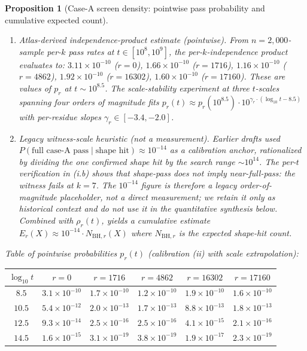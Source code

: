 \documentclass[11pt]{article}
\renewcommand{\_}{\origunderscore\allowbreak}
\newtheorem{proposition}[theorem]{Proposition}
\theoremstyle{definition}
\theoremstyle{remark}
\begin{document}
\begin{proposition}[Case-A screen density: pointwise pass probability and cumulative expected count]
\begin{enumerate}
\item[(ii)] \emph{Atlas-derived independence-product estimate
(pointwise).}  From $n=2{,}000$-sample per-$k$ pass rates at
$t\in[10^8,10^9]$, the per-$k$-independence product evaluates to:
$3.11\times 10^{-10}$ ($r=0$), $1.66\times 10^{-10}$ ($r=1716$),
$1.16\times 10^{-10}$ ($r=4862$), $1.92\times 10^{-10}$ ($r=16302$),
$1.60\times 10^{-10}$ ($r=17160$).  These are values of $p_r$ at
$t\sim 10^{8.5}$.  The scale-stability experiment at three $t$-scales
spanning four orders of magnitude fits
$p_r(t) \approx p_r(10^{8.5})\cdot 10^{\gamma_r\cdot(\log_{10} t - 8.5)}$
with per-residue slopes $\gamma_r\in[-3.4,-2.0]$.

\item[(iii)] \emph{Legacy witness-scale heuristic (not a measurement).}
Earlier drafts used $P(\text{full case-A pass}\mid \text{shape hit})
\approx 10^{-14}$ as a calibration anchor, rationalized by dividing
the one confirmed shape hit by the search range $\sim 10^{14}$.  The
per-$t$ verification in (i.b) shows that shape-pass does not imply
near-full-pass: the witness fails at $k=7$.  The $10^{-14}$ figure is
therefore a legacy order-of-magnitude placeholder, not a direct
measurement; we retain it only as historical context and do not use
it in the quantitative synthesis below.
Combined with $\rho_r(t)$, yields a cumulative estimate
$E_r(X)\approx 10^{-14}\cdot N_{\mathrm{BH}, r}(X)$ where
$N_{\mathrm{BH},r}$ is the expected shape-hit count.
\end{enumerate}

\emph{Table of pointwise probabilities $p_r(t)$} (calibration (ii) with
scale extrapolation):

\begin{center}
\begin{tabular}{c|ccccc}
\hline
$\log_{10} t$ & $r=0$ & $r=1716$ & $r=4862$ & $r=16302$ & $r=17160$ \\
\hline
$8.5$  & $3.1\times 10^{-10}$ & $1.7\times 10^{-10}$ & $1.2\times 10^{-10}$ & $1.9\times 10^{-10}$ & $1.6\times 10^{-10}$ \\
$10.5$ & $5.4\times 10^{-12}$ & $2.0\times 10^{-13}$ & $1.7\times 10^{-13}$ & $8.8\times 10^{-13}$ & $1.8\times 10^{-13}$ \\
$12.5$ & $9.3\times 10^{-14}$ & $2.5\times 10^{-16}$ & $2.5\times 10^{-16}$ & $4.1\times 10^{-15}$ & $2.1\times 10^{-16}$ \\
$14.5$ & $1.6\times 10^{-15}$ & $3.1\times 10^{-19}$ & $3.8\times 10^{-19}$ & $1.9\times 10^{-17}$ & $2.3\times 10^{-19}$ \\
\hline
\end{tabular}
\end{center}


\end{proposition}
\end{document}
